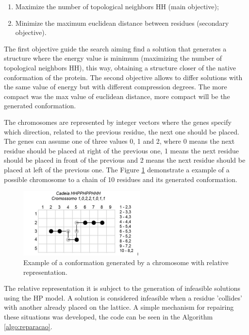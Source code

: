 \documentclass[conference]{IEEEtran}
\begin{document}
\begin{enumerate}[I]
	\item Maximize the number of topological neighbors HH (main objective);
	\item Minimize the maximum euclidean distance between residues (secondary objective).
\end{enumerate}


The first objective guide the search aiming find a solution that generates a structure where the energy value is minimum (maximizing the number of topological neighbors HH), this way, obtaining a structure closer of the native conformation of the protein. The second objective allows to differ solutions with the same value of energy but with different compression degrees. The more compact was the max value of euclidean distance, more compact will be the generated conformation.


The chromosomes are represented by integer vectors where the genes specify which direction, related to the previous residue, the next one should be placed. The genes can assume one of three values 0, 1 and 2, where 0 means the next residue should be placed at right of the previous one, 1 means the next residue should be placed in front of the previous and 2 means the next residue should be placed at left of the previous one. The Figure \ref{fig_sim} demonstrate a example of a possible chromosome to a chain of 10 residues and its generated conformation.

\begin{figure}[ht]
	\centering
	\includegraphics[width=2.5in]{figures/figure3.png}
	\caption{Example of a conformation generated by a chromosome with relative representation.}
	\label{fig_sim}
\end{figure}


The relative representation it is subject to the generation of infeasible solutions using the HP model. A solution is considered infeasible when a residue 'collides' with another already placed on the lattice. A simple mechanism for repairing these situations was developed, the code can be seen in the Algorithm \ref{algo:reparacao}.
\end{document}
